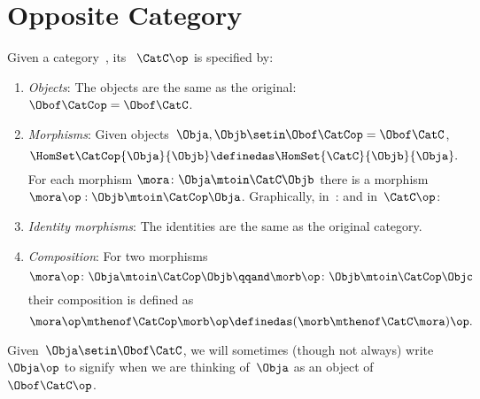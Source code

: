 
\section{Opposite Category}

\begin{ctdefinition}
    \label{def:opposite-category}
    \label{def:oppositecat}
    Given a category~\CatC, its \emph{}~$\CatC\op$ is specified by:
    \begin{enumerate}
        \item \emph{Objects}: The objects are the same as the original: $\Obof\CatCop = \Obof\CatC$.

        \item \emph{Morphisms}: Given objects~$\Obja,  \Objb \setin \Obof\CatCop = \Obof\CatC$,
              \begin{equation}
                  \label{eq:homset-op-cat}
                  \HomSet\CatCop{\Obja}{\Objb} \definedas \HomSet{\CatC}{\Objb}{\Obja}.
              \end{equation}
              For each morphism $\mora\colon\Obja\mtoin\CatC\Objb$ there is a morphism
              $\mora\op:\Objb\mtoin\CatCop\Obja$.
              Graphically, in~\CatC:
              and in~$\CatC\op$:
        \item \emph{Identity morphisms}: The identities are the same as the original category.
        \item \emph{Composition}: For two morphisms
              \begin{equation}
                  \mora\op\colon \Obja \mtoin\CatCop \Objb
                  \qqand
                  \morb\op\colon \Objb \mtoin\CatCop \Objc
              \end{equation}
              their composition is defined as
              \begin{equation}
                  \mora\op \mthenof\CatCop \morb\op \definedas (\morb \mthenof\CatC \mora)\op.
              \end{equation}
    \end{enumerate}
\end{ctdefinition}
Given~$\Obja \setin  \Obof\CatC$, we will sometimes (though not always) write $\Obja\op$ to signify when we are thinking of~$\Obja$ as an object of~$\Obof\CatC\op$.

